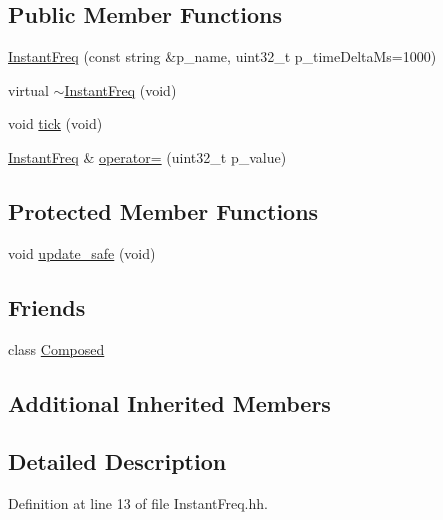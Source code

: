 \subsection*{Public Member Functions}
\begin{DoxyCompactItemize}
\item 
\hyperlink{classxtd_1_1counters_1_1InstantFreq_a428c013f73c1322ee3fc74cc08171c8c}{Instant\+Freq} (const string \&p\+\_\+name, uint32\+\_\+t p\+\_\+time\+Delta\+Ms=1000)
\item 
virtual \hyperlink{classxtd_1_1counters_1_1InstantFreq_a1a002d74711692449aec178e09606193}{$\sim$\+Instant\+Freq} (void)
\item 
void \hyperlink{classxtd_1_1counters_1_1InstantFreq_a1760f09b25b97545169be189bf99d250}{tick} (void)
\item 
\hyperlink{classxtd_1_1counters_1_1InstantFreq}{Instant\+Freq} \& \hyperlink{classxtd_1_1counters_1_1InstantFreq_a3ae7dc13ff6209a0628cdf481ab0a37c}{operator=} (uint32\+\_\+t p\+\_\+value)
\end{DoxyCompactItemize}
\subsection*{Protected Member Functions}
\begin{DoxyCompactItemize}
\item 
void \hyperlink{classxtd_1_1counters_1_1InstantFreq_a2e4629f5a835d7b52425a72f25dcd4d2}{update\+\_\+safe} (void)
\end{DoxyCompactItemize}
\subsection*{Friends}
\begin{DoxyCompactItemize}
\item 
class \hyperlink{classxtd_1_1counters_1_1InstantFreq_a93e934ad70d5b32b14beed5572450abf}{Composed}
\end{DoxyCompactItemize}
\subsection*{Additional Inherited Members}


\subsection{Detailed Description}


Definition at line 13 of file Instant\+Freq.\+hh.



